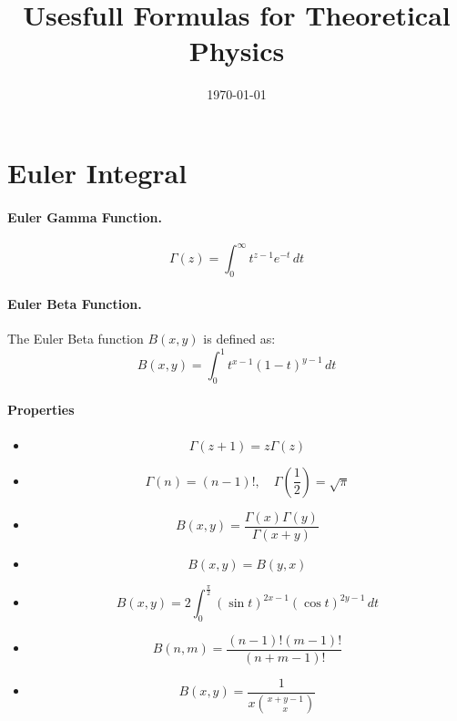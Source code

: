 \documentclass{article}
\begin{document}
\title{Usesfull Formulas for Theoretical Physics}
\date{\today}
\maketitle

\section{Euler Integral}
\paragraph{Euler Gamma Function.}
\[
\Gamma(z) = \int_{0}^{\infty} t^{z-1} e^{-t} \, dt
\]
\paragraph{Euler Beta Function.}
The Euler Beta function $B(x, y)$ is defined as:
\[
B(x, y) = \int_{0}^{1} t^{x-1} (1-t)^{y-1} \, dt
\]
\paragraph{Properties}
\begin{itemize}
    \item 
    \[
    \Gamma(z+1) = z \Gamma(z)
    \]
    \item 
    \[
    \Gamma(n) = (n-1)!, \quad \Gamma\left(\frac{1}{2}\right) = \sqrt{\pi}
    \]
    \item 
    \[
    B(x, y) = \frac{\Gamma(x)\Gamma(y)}{\Gamma(x+y)}
    \]
    \item 
    \[
    B(x, y) = B(y, x)
    \]
    \item
    \[
    B(x, y) = 2 \int_{0}^{\frac{\pi}{2}} (\sin t)^{2x-1} (\cos t)^{2y-1} \, dt
    \]
    \item
    \[
    B(n, m) = \frac{(n-1)!(m-1)!}{(n+m-1)!}
    \]
    \item 
    \[
    B(x, y) = \frac{1}{x \binom{x+y-1}{x}}
    \]
\end{itemize}
\end{document}
